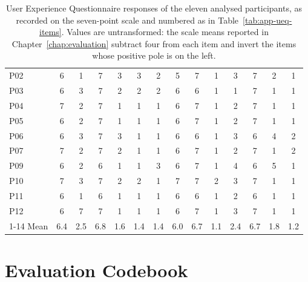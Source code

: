 \begin{table}[htpb]
\begin{tabular}{l*{13}{c}}
        P02 & 6 & 1 & 7 & 3 & 3 & 2 & 5 & 7 & 1 & 3 & 7 & 2 & 1 \\
        P03 & 6 & 3 & 7 & 2 & 2 & 2 & 6 & 6 & 1 & 1 & 7 & 1 & 1 \\
        P04 & 7 & 2 & 7 & 1 & 1 & 1 & 6 & 7 & 1 & 2 & 7 & 1 & 1 \\
        P05 & 6 & 2 & 7 & 1 & 1 & 1 & 6 & 7 & 1 & 2 & 7 & 1 & 1 \\
        P06 & 6 & 3 & 7 & 3 & 1 & 1 & 6 & 6 & 1 & 3 & 6 & 4 & 2 \\
        P07 & 7 & 2 & 7 & 2 & 1 & 1 & 6 & 7 & 1 & 2 & 7 & 1 & 2 \\
        P09 & 6 & 2 & 6 & 1 & 1 & 3 & 6 & 7 & 1 & 4 & 6 & 5 & 1 \\
        P10 & 7 & 3 & 7 & 2 & 2 & 1 & 7 & 7 & 2 & 3 & 7 & 1 & 1 \\
        P11 & 6 & 1 & 6 & 1 & 1 & 1 & 6 & 6 & 1 & 2 & 6 & 1 & 1 \\
        P12 & 6 & 7 & 7 & 1 & 1 & 1 & 6 & 7 & 1 & 3 & 7 & 1 & 1 \\
        \cmidrule(lr){1-14}
        Mean & 6.4 & 2.5 & 6.8 & 1.6 & 1.4 & 1.4 & 6.0 & 6.7 & 1.1 & 2.4 & 6.7 & 1.8 & 1.2 \\
        \bottomrule
    \end{tabular}
    \caption{User Experience Questionnaire responses of the eleven analysed participants, as recorded on the seven-point scale and numbered as in Table~\ref{tab:app-ueq-items}. Values are untransformed: the scale means reported in Chapter~\ref{chap:evaluation} subtract four from each item and invert the items whose positive pole is on the left.}
    \label{tab:app-ueq-responses}
\end{table}

\FloatBarrier

\section{Evaluation Codebook}
\label{app:eval-codebook}

